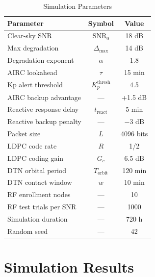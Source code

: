 \documentclass[journal]{IEEEtran}
\begin{document}
\begin{table}[!t]
\centering
\caption{Simulation Parameters}
\label{tab:params}
\begin{tabular}{lcc}
\toprule
\textbf{Parameter} & \textbf{Symbol} & \textbf{Value} \\
\midrule
Clear-sky SNR          & $\text{SNR}_0$             & 18 dB \\
Max degradation        & $\Delta_{\max}$            & 14 dB \\
Degradation exponent   & $\alpha$                   & 1.8 \\
AIRC lookahead         & $\tau$                     & 15 min \\
Kp alert threshold     & $K_p^{\text{thresh}}$      & 4.5 \\
AIRC backup advantage  & ---                        & +1.5 dB \\
Reactive response delay & $t_{\text{react}}$         & 5 min \\
Reactive backup penalty & ---                        & $-$3 dB \\
Packet size            & $L$                        & 4096 bits \\
LDPC code rate         & $R$                        & 1/2 \\
LDPC coding gain       & $G_c$                      & 6.5 dB \\
DTN orbital period     & $T_{\text{orbit}}$         & 120 min \\
DTN contact window     & $w$                        & 10 min \\
RF enrollment nodes    & ---                        & 10 \\
RF test trials per SNR & ---                        & 1000 \\
Simulation duration    & ---                        & 720 h \\
Random seed            & ---                        & 42 \\
\bottomrule
\end{tabular}
\end{table}



\section{Simulation Results}
\end{document}

